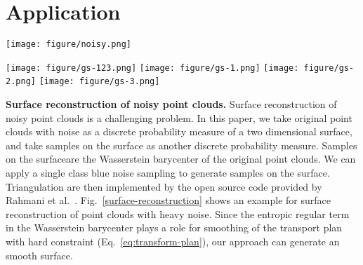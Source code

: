 \section{Application}

\begin{figure*}[htb]
  \centering

  \texttt{[image: figure/noisy.png]}
  \caption{Surface reconstruction of noisy point clouds.
  (a) is original point clouds with $8856$ points.
  (c) is mesh reconstruction result on $3946$ sampling points.
  (b) is rendering result with point clouds (a) and mesh model (c).
  (d) is the close-up view of (c) at the square mark.
   }\label{surface-reconstruction}
\end{figure*}

\begin{figure*}[htb]
  \centering
   \begin{minipage}{1\textwidth}
  \texttt{[image: figure/gs-123.png]}
  \texttt{[image: figure/gs-1.png]}
  \texttt{[image: figure/gs-2.png]}
  \texttt{[image: figure/gs-3.png]}
  \end{minipage}
  \caption{Object placement on a complex geometry model.
  The number of samples of each class is $200$, $1000$ and $1000$.}\label{gs-sampling}
\end{figure*}


\textbf{Surface reconstruction of noisy point clouds.}
Surface reconstruction of noisy point clouds is a challenging problem.
In this paper,
we take original point clouds with noise as a discrete probability measure of a two dimensional surface,
and take samples on the surface as another discrete probability measure.
Samples on the surfaceare the Wasserstein barycenter of the original point clouds.
We can apply a single class blue noise sampling to generate samples on the surface.
Triangulation are then implemented by the open source code provided by Rahmani et al.~\cite{rahmani:2014:hopc}.
Fig.~\ref{surface-reconstruction} shows an example for surface reconstruction of point clouds with heavy noise.
Since the entropic regular term in the Wasserstein barycenter plays a role for smoothing of the transport plan with hard constraint (Eq.~\ref{eq:transform-plan}),
our approach can generate an smooth surface.

